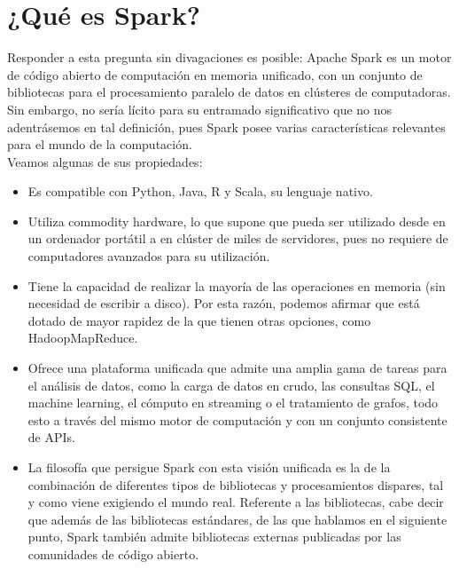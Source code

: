 \chapter{¿Qué es Spark?}
Responder a esta pregunta sin divagaciones es posible: Apache Spark es un motor de código abierto de computación en memoria unificado, con un conjunto de bibliotecas para el procesamiento paralelo de datos en clústeres de computadoras. Sin embargo, no sería lícito para su entramado significativo que no nos adentrásemos en tal definición, pues Spark  posee varias características  relevantes para el mundo de la computación.\\

Veamos algunas de sus propiedades:\\

\begin{itemize}
\item Es compatible con Python, Java, R y Scala, su lenguaje nativo.\\

\item Utiliza commodity hardware, lo que supone que pueda ser utilizado desde en un ordenador portátil a en clúster de miles de servidores, pues no requiere de computadores avanzados para su utilización.\\

\item Tiene la capacidad de realizar la mayoría de las operaciones en memoria (sin necesidad de escribir a disco). Por esta razón, podemos afirmar que está dotado de mayor rapidez de la que tienen otras opciones, como HadoopMapReduce.\\

\item Ofrece una plataforma unificada que admite una amplia gama de tareas para el análisis de datos, como la carga de datos en crudo, las consultas SQL, el machine learning, el cómputo en streaming o el tratamiento de grafos, todo esto a través del mismo motor de computación y con un conjunto consistente de APIs. \\

\item La filosofía que persigue Spark con esta visión unificada es la de la combinación de diferentes tipos de bibliotecas y procesamientos dispares, tal y como viene exigiendo el mundo real. Referente a las bibliotecas, cabe decir que además de las bibliotecas estándares, de las que hablamos en el siguiente punto, Spark también admite bibliotecas externas publicadas por las comunidades de código abierto.\\


\end{itemize}
